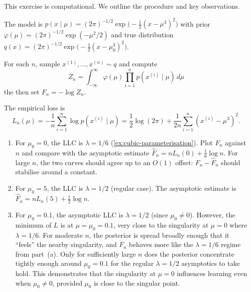 \documentclass[11pt]{article}
\begin{document}

\begin{solution}
    This exercise is computational. We outline the procedure and key
    observations.

    The model is $p(x \mid \mu) = (2\pi)^{-1/2}
    \exp\!\big({-}\tfrac{1}{2}(x - \mu^3)^2\big)$ with prior
    $\varphi(\mu) = (2\pi)^{-1/2}\exp(-\mu^2/2)$ and true distribution
    $q(x) = (2\pi)^{-1/2}\exp\!\big({-}\tfrac{1}{2}(x-\mu_0^3)^2\big)$.

    For each $n$, sample $x^{(1)}, \ldots, x^{(n)} \sim q$ and compute
    \begin{equation*}
        Z_n
        = \int_{-\infty}^{\infty}
            \varphi(\mu)
            \prod_{i=1}^n p(x^{(i)} \mid \mu)\, d\mu
    \end{equation*}
    the then set $F_n = -\log Z_n$.

    The empirical loss is
    \begin{equation*}
        L_n(\mu)
        = -\frac{1}{n}\sum_{i=1}^n \log p(x^{(i)} \mid \mu)
        = \frac{1}{2}\log(2\pi)
          + \frac{1}{2n}\sum_{i=1}^n (x^{(i)} - \mu^3)^2.
    \end{equation*}

    \begin{enumerate}
        \item
            For $\mu_0 = 0$, the LLC is $\lambda = 1/6$
            (\cref{ex:cubic-parameterisation}). Plot $F_n$ against $n$
            and compare with the asymptotic estimate
            $\hat F_n = n L_n(0) + \tfrac{1}{6}\log n$.
            For large $n$, the two curves should agree up to an
            $O(1)$ offset: $F_n - \hat F_n$ should stabilise
            around a constant.
        \item
            For $\mu_0 = 5$, the LLC is $\lambda = 1/2$ (regular case).
            The asymptotic estimate is
            $\hat F_n = n L_n(5) + \tfrac{1}{2}\log n$.
        \item
            For $\mu_0 = 0.1$, the asymptotic LLC is $\lambda = 1/2$
            (since $\mu_0 \neq 0$). However, the minimum of $L$ is at
            $\mu = \mu_0 = 0.1$, very close to the singularity at
            $\mu = 0$ where $\lambda = 1/6$. For moderate $n$, the
            posterior is spread broadly enough that it ``feels'' the
            nearby singularity, and $F_n$ behaves more like the
            $\lambda = 1/6$ regime from part~(a). Only for sufficiently
            large $n$ does the posterior concentrate tightly enough
            around $\mu_0 = 0.1$ for the regular $\lambda = 1/2$
            asymptotics to take hold.
            This demonstrates that the singularity at $\mu = 0$
            influences learning even when $\mu_0 \neq 0$, provided
            $\mu_0$ is close to the singular point. \qedhere
    \end{enumerate}
\end{solution}
\end{document}
